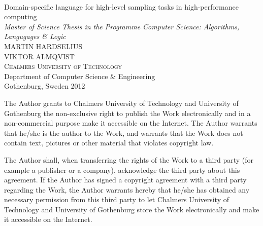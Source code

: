 \begin{titlepage}

\mbox{}
\vfill
\addtolength{\voffset}{2cm}
\begin{flushleft}
  {\\[0.2cm]
    {\huge Domain-specific language for high-level sampling
      tasks in high-performance computing}\\[.5cm]
    \emph{\Large Master of Science Thesis in the Programme Computer
      Science: Algorithms, Langugages \& Logic}\\[.8cm]
      
	
    {\huge MARTIN HARDSELIUS}\\[.8cm]
    {\huge VIKTOR ALMQVIST}\\[.8cm]
	
    {\textsc{Chalmers University of Technology}\\
      \Large Department of Computer Science \& Engineering \\
	Gothenburg, Sweden 2012 \\
    } 
  }
\end{flushleft}

\end{titlepage}
\ClearShipoutPicture

\pagestyle{empty}
\newpage
\clearpage
The Author grants to Chalmers University of Technology and University
of Gothenburg the non-exclusive right to publish the Work
electronically and in a non-commercial purpose make it accessible on
the Internet.  The Author warrants that he/she is the author to the
Work, and warrants that the Work does not contain text, pictures or
other material that violates copyright law.

The Author shall, when transferring the rights of the Work to a third
party (for example a publisher or a company), acknowledge the third
party about this agreement. If the Author has signed a copyright
agreement with a third party regarding the Work, the Author warrants
hereby that he/she has obtained any necessary permission from this
third party to let Chalmers University of Technology and University of
Gothenburg store the Work electronically and make it accessible on the
Internet.
\mbox{}
\vfill


